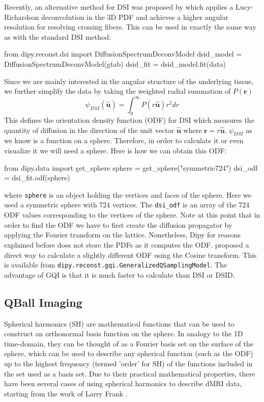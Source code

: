 \documentclass{bioinfo}
\begin{document}
Recently, an alternative method for DSI was proposed by \citep{canales-rodriguez-etal:10} which applies a Lucy-Richardson deconvolution in the 3D PDF and achieves a higher angular resolution for resolving crossing fibers. This can be used in exactly the same way as with the standard DSI method:
\begin{python}
from dipy.reconst.dsi import
                      DiffusionSpectrumDeconvModel
dsid_model = DiffusionSpectrumDeconvModel(gtab)
dsid_fit = dsid_model.fit(data)
\end{python}
Since we are mainly interested in the angular structure of the underlying tissue, we further simplify the data by taking the weighted radial summation of $P(\mathbf{r})$
\begin{equation}
\psi_{DSI}(\hat{\mathbf{u}})=\int_{0}^{\infty}P(r\hat{\mathbf{u}})r^{2}dr\label{eq:ODF_DSI}
\end{equation}
\noindent This defines the orientation density function (ODF) for DSI which measures the quantity of diffusion in the direction of the unit vector $\mathbf{\hat{u}}$ where $\mathbf{r=}r\hat{\mathbf{u}}$. $\psi_{DSI}$ as we know is a function on a sphere. Therefore, in order to calculate it or even visualize it we will need a sphere. Here is how we can obtain this ODF:
\begin{python}
from dipy.data import get_sphere
sphere = get_sphere("symmetric724")
dsi_odf = dsi_fit.odf(sphere)
\end{python}
where \texttt{sphere} is an object holding the vertices and faces of the sphere. Here we used a symmetric sphere with 724 vertices. The \texttt{dsi\_odf} is an array of the 724 ODF values corresponding to the vertices of the sphere. Note at this point that in order to find the ODF we have to first create the diffusion propagator by applying the Fourier transform on the lattice. Nonetheless, Dipy for reasons explained before does not store the PDFs as it computes the ODF. \cite{yeh-etal:10} proposed a direct way to calculate a slightly different ODF using the Cosine transform. This is available from \texttt{dipy.reconst.gqi.GeneralizedQSamplingModel}. The advantage of GQI is that it is much faster to calculate than DSI or DSID.

\subsection{QBall Imaging}

Spherical harmonics (SH) are mathematical functions that can be used to construct an orthonormal basis function on the sphere. In analogy to the 1D time-domain, they can be thought of as a Fourier basis set on the surface of the sphere, which can be used to describe any spherical function (such as the ODF) up to the highest frequency (termed 'order' for SH) of the functions included in the set used as a basis set. Due to their practical mathematical properties, there have been several cases of using spherical harmonics to describe dMRI data, starting from the work of Larry Frank \citep{Frank2001, Frank2002}.
\end{document}
